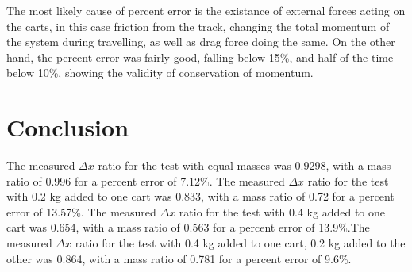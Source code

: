 \documentclass[11pt, titlepage]{article}
\begin{document}
The most likely cause of percent error is the existance of external forces acting on the carts, in this case friction from the track, changing the total momentum of the system during travelling, as well as drag force doing the same. On the other hand, the percent error was fairly good, falling below 15\%, and half of the time below 10\%, showing the validity of conservation of momentum.

\section*{Conclusion}
The measured $\Delta x$ ratio for the test with equal masses was 0.9298, with a mass ratio of 0.996 for a percent error of 7.12\%. The measured $\Delta x$ ratio for the test with 0.2 kg added to one cart  was 0.833, with a mass ratio of 0.72 for a percent error of 13.57\%. The measured $\Delta x$ ratio for the test with 0.4 kg added to one cart was 0.654, with a mass ratio of 0.563 for a percent error of 13.9\%.The measured $\Delta x$ ratio for the test with 0.4 kg added to one cart, 0.2 kg added to the other was 0.864, with a mass ratio of 0.781 for a percent error of 9.6\%.
\end{document}
